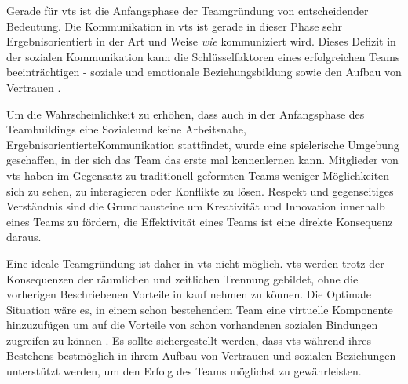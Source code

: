 \documentclass[a4paper,11pt]{article}%
\renewcommand{\\}{\vspace*{0.5\baselineskip} \newline}
\begin{document}

Gerade für \ac{vts} ist die Anfangsphase der Teamgründung von entscheidender Bedeutung. 
Die Kommunikation in \ac{vts} ist gerade in dieser Phase sehr Ergebnisorientiert in der Art und Weise \textit{wie} kommuniziert wird. Dieses Defizit in der sozialen Kommunikation kann die Schlüsselfaktoren eines erfolgreichen Teams beeinträchtigen - soziale und emotionale Beziehungsbildung sowie den Aufbau von Vertrauen \citep[p.378]{ren2007applying}.

Um die Wahrscheinlichkeit zu erhöhen, dass auch in der Anfangsphase des Teambuildings eine \glqq Soziale\grqq und keine \glqq Arbeitsnahe, Ergebnisorientierte\grqq Kommunikation stattfindet, wurde eine spielerische Umgebung geschaffen, in der sich das Team das erste mal kennenlernen kann. 
Mitglieder von \ac{vts} haben im Gegensatz zu traditionell geformten Teams weniger Möglichkeiten sich zu sehen, zu interagieren oder Konflikte zu lösen. 
Respekt und gegenseitiges Verständnis sind die Grundbausteine um Kreativität und Innovation innerhalb eines Teams zu fördern, die Effektivität eines Teams ist eine direkte Konsequenz daraus.


Eine ideale Teamgründung ist daher in \ac{vts} nicht möglich. 
\ac{vts} werden trotz der Konsequenzen der räumlichen und zeitlichen Trennung gebildet, ohne die vorherigen Beschriebenen Vorteile in kauf nehmen zu können. Die Optimale Situation wäre es, in einem schon bestehendem Team eine virtuelle Komponente hinzuzufügen um auf die Vorteile von schon vorhandenen sozialen Bindungen zugreifen zu können \citep[p.36-37]{holton2001building}.
Es sollte sichergestellt werden, dass \ac{vts} während ihres Bestehens bestmöglich in ihrem Aufbau von Vertrauen und sozialen Beziehungen unterstützt werden, um den Erfolg des Teams möglichst zu gewährleisten.
\end{document}
